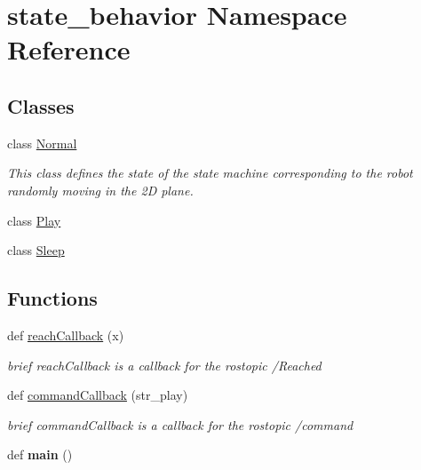 \hypertarget{namespacestate__behavior}{}\section{state\+\_\+behavior Namespace Reference}
\label{namespacestate__behavior}
\subsection*{Classes}
\begin{DoxyCompactItemize}
\item 
class \hyperlink{classstate__behavior_1_1Normal}{Normal}
\begin{DoxyCompactList}\small\item\em This class defines the state of the state machine corresponding to the robot randomly moving in the 2D plane. \end{DoxyCompactList}\item 
class \hyperlink{classstate__behavior_1_1Play}{Play}
\item 
class \hyperlink{classstate__behavior_1_1Sleep}{Sleep}
\end{DoxyCompactItemize}
\subsection*{Functions}
\begin{DoxyCompactItemize}
\item 
def \hyperlink{namespacestate__behavior_a8fd0bb9039915d9f16d70a83ed55df4f}{reach\+Callback} (x)
\begin{DoxyCompactList}\small\item\em brief reach\+Callback is a callback for the rostopic /\+Reached \end{DoxyCompactList}\item 
def \hyperlink{namespacestate__behavior_a2e9f12e323b40da64c0afaf87e2b5586}{command\+Callback} (str\+\_\+play)
\begin{DoxyCompactList}\small\item\em brief command\+Callback is a callback for the rostopic /command \end{DoxyCompactList}\item 
\mbox{\label{namespacestate__behavior_a1c359ce0b57ff933eb53479a7055433f}} 
def {\bfseries main} ()
\end{DoxyCompactItemize}
